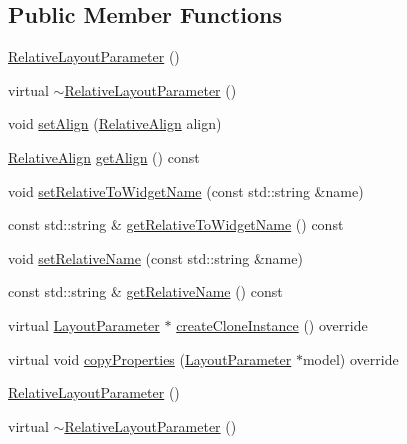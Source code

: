 \subsection*{Public Member Functions}
\begin{DoxyCompactItemize}
\item 
\hyperlink{classui_1_1RelativeLayoutParameter_a135c976765d002c634124d3049d27595}{Relative\+Layout\+Parameter} ()
\item 
virtual \hyperlink{classui_1_1RelativeLayoutParameter_a27550ff5e299abc21ca72a8cc4bea3df}{$\sim$\+Relative\+Layout\+Parameter} ()
\item 
void \hyperlink{classui_1_1RelativeLayoutParameter_a5eadca3a1cac5c1b87d493945281696a}{set\+Align} (\hyperlink{classui_1_1RelativeLayoutParameter_a40283d09524c58e61741de3288e6769d}{Relative\+Align} align)
\item 
\hyperlink{classui_1_1RelativeLayoutParameter_a40283d09524c58e61741de3288e6769d}{Relative\+Align} \hyperlink{classui_1_1RelativeLayoutParameter_ad4cdf1f742c39831440047ae90ad9160}{get\+Align} () const
\item 
void \hyperlink{classui_1_1RelativeLayoutParameter_aa1ba720efd1054c7dfedca47dfb26975}{set\+Relative\+To\+Widget\+Name} (const std\+::string \&name)
\item 
const std\+::string \& \hyperlink{classui_1_1RelativeLayoutParameter_aca4e12f2edd43375f8af9c528270f8e3}{get\+Relative\+To\+Widget\+Name} () const
\item 
void \hyperlink{classui_1_1RelativeLayoutParameter_a08d5be0738e5aa06c95d4ecf20b87b5f}{set\+Relative\+Name} (const std\+::string \&name)
\item 
const std\+::string \& \hyperlink{classui_1_1RelativeLayoutParameter_a9b0f38b4f867f2acd88b85b37b76a0d4}{get\+Relative\+Name} () const
\item 
virtual \hyperlink{classui_1_1LayoutParameter}{Layout\+Parameter} $\ast$ \hyperlink{classui_1_1RelativeLayoutParameter_ac9b09ffad77d413122c56c06c230c4c7}{create\+Clone\+Instance} () override
\item 
virtual void \hyperlink{classui_1_1RelativeLayoutParameter_a901aed8a9c121ff7c62a488facc7edfd}{copy\+Properties} (\hyperlink{classui_1_1LayoutParameter}{Layout\+Parameter} $\ast$model) override
\item 
\hyperlink{classui_1_1RelativeLayoutParameter_a135c976765d002c634124d3049d27595}{Relative\+Layout\+Parameter} ()
\item 
virtual \hyperlink{classui_1_1RelativeLayoutParameter_a27550ff5e299abc21ca72a8cc4bea3df}{$\sim$\+Relative\+Layout\+Parameter} ()

\end{DoxyCompactItemize}
